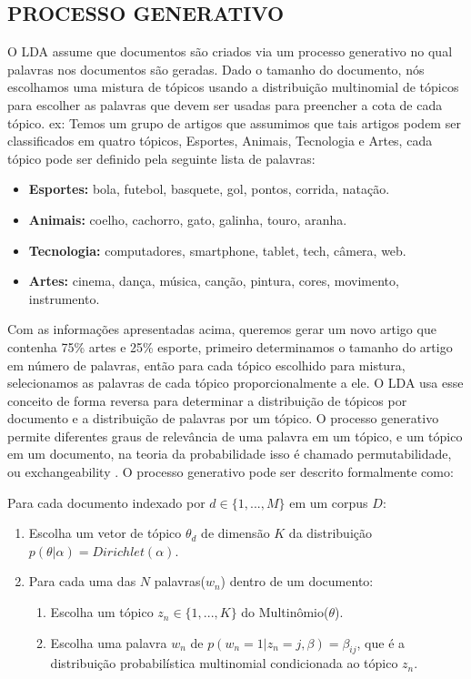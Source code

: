 \documentclass[12pt,a4paper]{article}
\begin{document}
\subsection{PROCESSO GENERATIVO}
O LDA assume que documentos são criados via um processo generativo no qual palavras nos documentos são geradas. Dado o tamanho do documento,
 nós escolhamos uma mistura de tópicos usando a distribuição multinomial de tópicos para escolher as palavras que devem ser usadas para preencher a cota de cada tópico. ex:
 Temos um grupo de artigos que assumimos que tais artigos podem ser classificados em quatro tópicos, Esportes, Animais, Tecnologia e Artes, cada tópico pode ser definido pela seguinte lista de palavras:

\begin{itemize}
  \item \textbf{ Esportes:} bola, futebol, basquete, gol, pontos, corrida, natação.
  \item \textbf{ Animais:} coelho, cachorro, gato, galinha, touro, aranha.
  \item \textbf{ Tecnologia:} computadores, smartphone, tablet, tech, câmera, web.
  \item \textbf{ Artes:} cinema, dança, música, canção, pintura, cores, movimento, instrumento.
\end{itemize}

Com as informações apresentadas acima, queremos gerar um novo artigo que contenha 75\% artes e 25\% esporte, primeiro determinamos o tamanho do artigo em número de palavras,
 então para cada tópico escolhido para mistura, selecionamos as palavras de cada tópico proporcionalmente a ele. 
 O LDA usa esse conceito de forma reversa para determinar a distribuição de tópicos por documento e a distribuição de palavras por um tópico. 
 O processo generativo permite diferentes graus de relevância de uma palavra em um tópico, e um tópico em um documento, na teoria da probabilidade isso é chamado permutabilidade,
 ou exchangeability \cite{aldous1985exchangeability}. O processo generativo pode ser descrito formalmente como:

Para cada documento indexado por $d \in \{1,. . . , M\}$ em um corpus $D$:

\begin{enumerate}
  \item Escolha um vetor de tópico $\theta _d$ de dimensão $K$ da distribuição $p(\theta|\alpha)=Dirichlet(\alpha)$.
  \item Para cada uma das $N$ palavras($w_n$) dentro de um documento:
  \begin{enumerate}
  	\item Escolha um tópico \(z_n \in \{1,. . . , K\}\) do Multinômio($\theta$).
    \item Escolha uma palavra $w_n$ de \(p(w_n=1| z_n=j,\beta)=\beta _{ij}\), que é a distribuição probabilística multinomial condicionada ao tópico $z_n$.
  \end{enumerate}
\end{enumerate}
\end{document}

